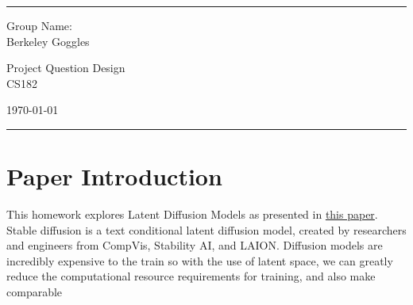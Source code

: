 \documentclass[a4paper]{article}
\begin{document}
\fancyhead[C]{}
\hrule \medskip %
\begin{minipage}{0.295\textwidth} 
\raggedright
\footnotesize
Group Name: \hfill \\
Berkeley Goggles
\end{minipage}
\begin{minipage}{0.4\textwidth} 
\centering 
\large 
Project Question Design\\ 
\normalsize 
CS182\\ 
\end{minipage}
\begin{minipage}{0.295\textwidth} 
\raggedleft
\today\hfill\\
\end{minipage}
\medskip\hrule 
\bigskip
\section{Paper Introduction}
This homework explores Latent Diffusion Models as presented in \href{https://arxiv.org/pdf/2112.10752.pdf}{this paper}. Stable diffusion is a text conditional latent diffusion model, created by researchers and engineers from CompVis, Stability AI, and LAION. Diffusion models are incredibly expensive to the train so with the use of latent space, we can greatly reduce the computational resource requirements for training, and also make comparable 
\end{document}
